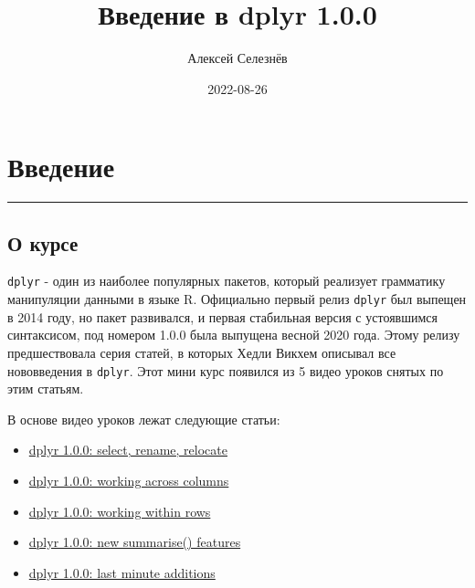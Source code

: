 \documentclass[
]{book}
\title{Введение в dplyr 1.0.0}
\author{Алексей Селезнёв}
\date{2022-08-26}
\providecommand{\tightlist}{%
  \setlength{\itemsep}{0pt}\setlength{\parskip}{0pt}}
\begin{document}
\maketitle

{
\setcounter{tocdepth}{1}
\tableofcontents
}
\hypertarget{ux432ux432ux435ux434ux435ux43dux438ux435}{%
\chapter*{Введение}\label{ux432ux432ux435ux434ux435ux43dux438ux435}}

\begin{center}\rule{0.5\linewidth}{0.5pt}\end{center}

\hypertarget{ux43e-ux43aux443ux440ux441ux435}{%
\section*{О курсе}\label{ux43e-ux43aux443ux440ux441ux435}}

\texttt{dplyr} - один из наиболее популярных пакетов, который реализует грамматику манипуляции данными в языке R. Официально первый релиз \texttt{dplyr} был выпещен в 2014 году, но пакет развивался, и первая стабильная версия с устоявшимся синтаксисом, под номером 1.0.0 была выпущена весной 2020 года. Этому релизу предшествовала серия статей, в которых Хедли Викхем описывал все нововведения в \texttt{dplyr}. Этот мини курс появился из 5 видео уроков снятых по этим статьям.

В основе видео уроков лежат следующие статьи:

\begin{itemize}
\tightlist
\item
  \href{https://www.tidyverse.org/blog/2020/03/dplyr-1-0-0-select-rename-relocate/}{dplyr 1.0.0: select, rename, relocate}
\item
  \href{https://www.tidyverse.org/blog/2020/04/dplyr-1-0-0-colwise/}{dplyr 1.0.0: working across columns}
\item
  \href{https://www.tidyverse.org/blog/2020/04/dplyr-1-0-0-rowwise/}{dplyr 1.0.0: working within rows}
\item
  \href{https://www.tidyverse.org/blog/2020/03/dplyr-1-0-0-summarise/}{dplyr 1.0.0: new summarise() features}
\item
  \href{https://www.tidyverse.org/blog/2020/05/dplyr-1-0-0-last-minute-additions/}{dplyr 1.0.0: last minute additions}
\end{itemize}
\end{document}
